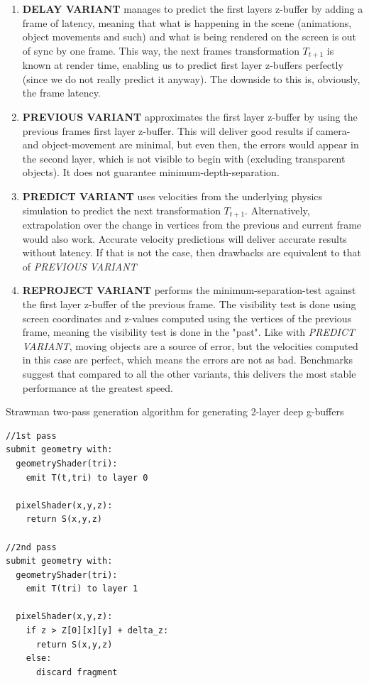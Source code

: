 \documentclass{ACGSeminar}
\begin{document}
		\begin{enumerate}
			\item \textbf{DELAY VARIANT} manages to predict the first layers z-buffer by adding a frame of latency, meaning that what is happening in the scene (animations, object movements and such) and what is being rendered on the screen is out of sync by one frame. This way, the next frames transformation $T_{t+1}$ is known at render time, enabling us to predict first layer z-buffers perfectly (since we do not really predict it anyway). The downside to this is, obviously, the frame latency.

			\item \textbf{PREVIOUS VARIANT} approximates the first layer z-buffer by using the previous frames first layer z-buffer. This will deliver good results if camera- and object-movement are minimal, but even then, the errors would appear in the second layer, which is not visible to begin with (excluding transparent objects). It does not guarantee minimum-depth-separation.

			\item \textbf{PREDICT VARIANT} uses velocities from the underlying physics simulation to predict the next transformation $T_{t+1}$. Alternatively, extrapolation over the change in vertices from the previous and current frame would also work. Accurate velocity predictions will deliver accurate results without latency. If that is not the case, then drawbacks are equivalent to that of \textit{PREVIOUS VARIANT}

			\item \textbf{REPROJECT VARIANT} performs the minimum-separation-test against the first layer z-buffer of the previous frame. The visibility test is done using screen coordinates and z-values computed using the vertices of the previous frame, meaning the visibility test is done in the "past". Like with \textit{PREDICT VARIANT}, moving objects are a source of error, but the velocities computed in this case are perfect, which means the errors are not as bad. Benchmarks suggest that compared to all the other variants, this delivers the most stable performance at the greatest speed.
		\end{enumerate} 
		\begin{algorithm} \label{alg:two_pass_strawman} \caption{Strawman two-pass generation algorithm for generating 2-layer deep g-buffers}
		\begin{lstlisting}[frame=single]
//1st pass
submit geometry with:
  geometryShader(tri):
    emit T(t,tri) to layer 0

  pixelShader(x,y,z):
    return S(x,y,z)

//2nd pass
submit geometry with:
  geometryShader(tri):
    emit T(tri) to layer 1

  pixelShader(x,y,z):
    if z > Z[0][x][y] + delta_z:
      return S(x,y,z)
    else:
      discard fragment
		\end{lstlisting}
		\end{algorithm}
\end{document}
